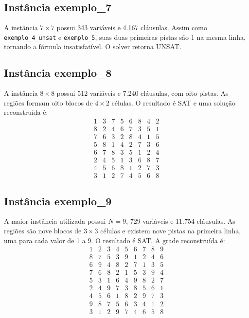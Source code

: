 \documentclass[a4paper, 12pt]{article}
\begin{document}
\subsection{Instância exemplo\_7}

A instância \(7\times7\) possui 343 variáveis e 4.167 cláusulas. Assim como \texttt{exemplo\_4\_unsat} e \texttt{exemplo\_5}, suas duas primeiras pistas são 1 na mesma linha, tornando a fórmula insatisfatível. O solver retorna UNSAT.

\subsection{Instância exemplo\_8}

A instância \(8\times8\) possui 512 variáveis e 7.240 cláusulas, com oito pistas. As regiões formam oito blocos de \(4\times2\) células. O resultado é SAT e uma solução reconstruída é:
\[
\begin{array}{cccccccc}
1 & 3 & 7 & 5 & 6 & 8 & 4 & 2 \\
8 & 2 & 4 & 6 & 7 & 3 & 5 & 1 \\
7 & 6 & 3 & 2 & 8 & 4 & 1 & 5 \\
5 & 8 & 1 & 4 & 2 & 7 & 3 & 6 \\
6 & 7 & 8 & 3 & 5 & 1 & 2 & 4 \\
2 & 4 & 5 & 1 & 3 & 6 & 8 & 7 \\
4 & 5 & 6 & 8 & 1 & 2 & 7 & 3 \\
3 & 1 & 2 & 7 & 4 & 5 & 6 & 8
\end{array}
\]

\subsection{Instância exemplo\_9}

A maior instância utilizada possui \(N=9\), 729 variáveis e 11.754 cláusulas. As regiões são nove blocos de \(3\times3\) células e existem nove pistas na primeira linha, uma para cada valor de 1 a 9. O resultado é SAT. A grade reconstruída é:
\[
\begin{array}{ccccccccc}
1 & 2 & 3 & 4 & 5 & 6 & 7 & 8 & 9 \\
8 & 7 & 5 & 3 & 9 & 1 & 2 & 4 & 6 \\
6 & 9 & 4 & 8 & 2 & 7 & 1 & 3 & 5 \\
7 & 6 & 8 & 2 & 1 & 5 & 3 & 9 & 4 \\
5 & 3 & 1 & 6 & 4 & 9 & 8 & 2 & 7 \\
2 & 4 & 9 & 7 & 3 & 8 & 5 & 6 & 1 \\
4 & 5 & 6 & 1 & 8 & 2 & 9 & 7 & 3 \\
9 & 8 & 7 & 5 & 6 & 3 & 4 & 1 & 2 \\
3 & 1 & 2 & 9 & 7 & 4 & 6 & 5 & 8
\end{array}
\]
\end{document}
